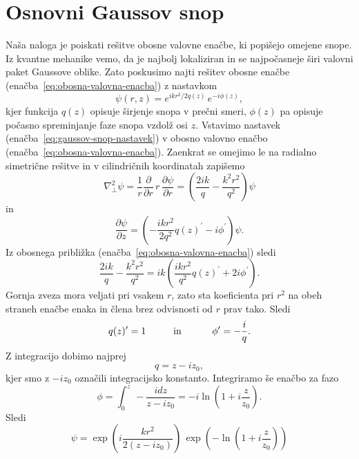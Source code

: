 \section{Osnovni Gaussov snop}
\label{chap:gaussovsnop}
Naša naloga je poiskati rešitve obosne valovne enačbe, ki popišejo omejene
snope. Iz kvantne mehanike vemo, da je najbolj lokaliziran in se najpočasneje
širi valovni paket Gaussove oblike. Zato poskusimo najti rešitev obosne
enačbe (enačba~\ref{eq:obosna-valovna-enacba}) z nastavkom
\begin{equation}
\psi(r,z)=e^{ikr^{2}/2q(z)}\, e^{-i\phi(z)},\label{eq:gaussov-snop-nastavek}
\end{equation}
kjer funkcija $q(z)$ opisuje širjenje snopa v prečni smeri,
$\phi(z)$ pa opisuje počasno spreminjanje faze snopa vzdolž osi $z$.
Vstavimo nastavek (enačba~\ref{eq:gaussov-snop-nastavek}) v obosno valovno enačbo 
(enačba~\ref{eq:obosna-valovna-enacba}). Zaenkrat se omejimo le na radialno 
simetrične rešitve in v cilindričnih koordinatah zapišemo
\begin{equation}
\nabla_{\perp}^{2}\psi=\frac{1}{r}\frac{\partial}{\partial r}\, r\,\frac{\partial\psi}{\partial r}=
\left( \frac{2ik}{q}-\frac{k^2r^2}{q^2}\right)\psi
\end{equation}
 in 
\begin{equation}
\frac{\partial\psi}{\partial z}=\left(-\frac{ikr^{2}}{2q^2}q(z)^{\prime}-i\phi^{\prime}\right)\psi.
\end{equation}
Iz obosnega približka (enačba~\ref{eq:obosna-valovna-enacba}) sledi
\begin{equation}
\frac{2ik}{q}-\frac{k^2r^2}{q^2}=ik\left(\frac{ikr^{2}}{q^2}q(z)^{\prime}+2i\phi^{\prime}\right).
\end{equation}
Gornja zveza mora veljati pri vsakem $r$, zato sta koeficienta
pri $r^{2}$ na obeh straneh enačbe enaka in člena brez odvisnosti od $r$ prav tako. Sledi
\begin{equation}
q(z)^{\prime}=1\mbox{\hskip1cm in \hskip1cm}\phi^{\prime}=-\frac{i}{q}.
\end{equation}
Z integracijo dobimo najprej 
\begin{equation}
q=z-iz_{0},
\label{eq:alpha}
\end{equation}
kjer smo z $-i z_{0}$ označili integracijsko konstanto. 
Integriramo še enačbo za fazo 
\begin{equation}
\phi=\int_{0}^{z}\,-\frac{i dz}{z-iz_{0}}=-i\ln(1+i\frac{z}{z_{0}}).
\end{equation}
Sledi
\begin{equation}
\psi = \exp\left(i\frac{kr^{2}}{2(z-iz_0)}\right)\,\exp\left(-\ln(1+i\frac{z}{z_{0}})\right)
\end{equation}
